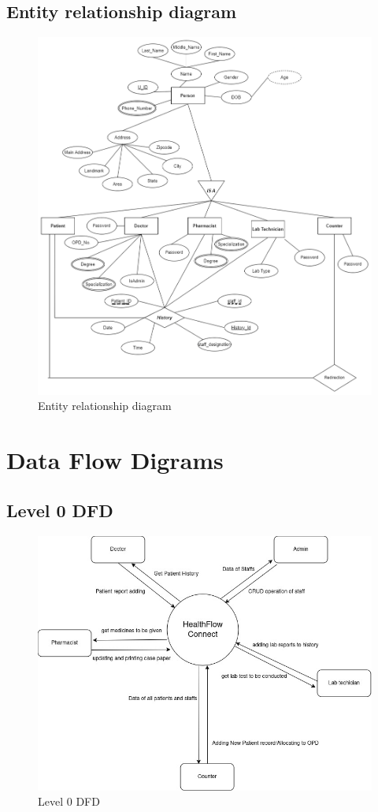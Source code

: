 \subsection{Entity relationship diagram}
\begin{figure}[h!]
    \centering
    \includegraphics[width=1.1\textwidth]{erd.png}
    \caption{Entity relationship diagram}
\end{figure}
\clearpage

\section{Data Flow Digrams}
\subsection{Level 0 DFD}
\begin{figure}[h!]
    \centering
    \includegraphics[width=1.1\textwidth]{level0dfd.jpg}
    \caption{Level 0 DFD}
\end{figure}
\clearpage
